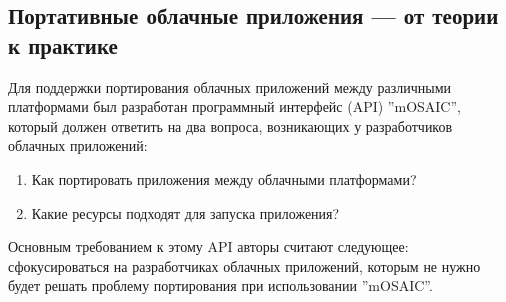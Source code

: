 \subsection{Портативные облачные приложения --- от теории к практике}
Для поддержки портирования облачных приложений между различными платформами был разработан программный интерфейс (API) ''mOSAIC''\cite{portable-cloud-applications}, который должен ответить на два вопроса, возникающих у разработчиков облачных приложений:
\begin{enumerate}
    \item Как портировать приложения между облачными платформами?
    \item Какие ресурсы подходят для запуска приложения?
\end{enumerate}
Основным требованием к этому API авторы считают следующее: сфокусироваться на разработчиках облачных приложений, которым не нужно будет решать проблему портирования при использовании ''mOSAIC''.

